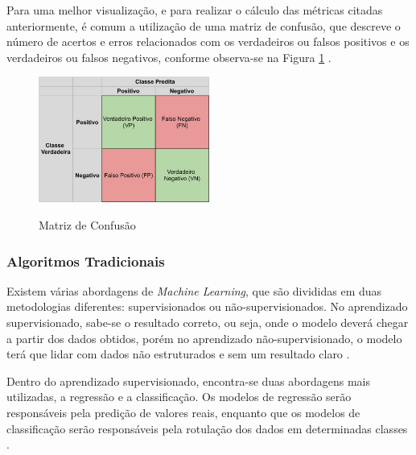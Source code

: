 Para uma melhor visualização, e para realizar o cálculo das métricas citadas anteriormente, é comum a utilização de uma matriz de confusão, que descreve o número de acertos e erros relacionados com os verdadeiros ou falsos positivos e os verdadeiros ou falsos negativos, conforme observa-se na Figura \ref{fig:confusionMatrix} \cite{machineLearningTensorFlow}.

\begin{figure}[!htb]
	\centering
	\caption{Matriz de Confusão}
	\includegraphics[width=0.50\textwidth]{img/confusionMatrix.jpg}
	\label{fig:confusionMatrix}
\end{figure}

\subsubsection{Algoritmos Tradicionais}

Existem várias abordagens de \emph{Machine Learning}, que são divididas em duas metodologias diferentes: supervisionados ou não-supervisionados. No aprendizado supervisionado, sabe-se o resultado correto, ou seja, onde o modelo deverá chegar a partir dos dados obtidos, porém no aprendizado não-supervisionado, o modelo terá que lidar com dados não estruturados e sem um resultado claro \cite{machineLearningPython}.

Dentro do aprendizado supervisionado, encontra-se duas abordagens mais utilizadas, a regressão e a classificação. Os modelos de regressão serão responsáveis pela predição de valores reais, enquanto que os modelos de classificação serão responsáveis pela rotulação dos dados em determinadas classes \cite{machineLearningPython}.

